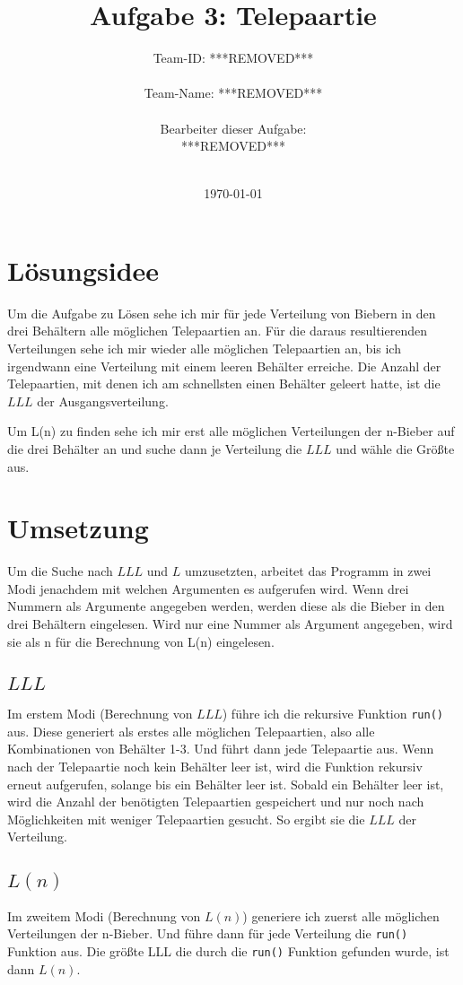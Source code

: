 \documentclass[a4paper,10pt]{scrartcl}
\title{Aufgabe 3: Telepaartie}
\author{Team-ID: ***REMOVED*** \\\\
	    Team-Name: ***REMOVED*** \\\\
	    Bearbeiter dieser Aufgabe: \\
	    ***REMOVED***\\\\}
\date{\today}
\begin{document}
\maketitle
\tableofcontents

\section{Lösungsidee}
Um die Aufgabe zu Lösen sehe ich mir für jede Verteilung von Biebern in den drei Behältern alle möglichen Telepaartien an. Für die daraus resultierenden Verteilungen sehe ich mir wieder alle möglichen Telepaartien an, bis ich irgendwann eine Verteilung mit einem leeren Behälter erreiche. Die Anzahl der Telepaartien, mit denen ich am schnellsten einen Behälter geleert hatte, ist die \(LLL\) der Ausgangsverteilung.

Um L(n) zu finden sehe ich mir erst alle möglichen Verteilungen der n-Bieber auf die drei Behälter an und suche dann je Verteilung die \(LLL\) und wähle die Größte aus.

\section{Umsetzung}
Um die Suche nach \(LLL\) und \(L\) umzusetzten, arbeitet das Programm in zwei Modi jenachdem mit welchen Argumenten es aufgerufen wird. Wenn drei Nummern als Argumente angegeben werden, werden diese als die Bieber in den drei Behältern eingelesen. Wird nur eine Nummer als Argument angegeben, wird sie als n für die Berechnung von L(n) eingelesen.

\subsection{\(LLL\)}
Im erstem Modi (Berechnung von \(LLL\)) führe ich die rekursive Funktion \lstinline|run()| aus. Diese generiert als erstes alle möglichen Telepaartien, also alle Kombinationen von Behälter 1-3. Und führt dann jede Telepaartie aus. Wenn nach der Telepaartie noch kein Behälter leer ist, wird die Funktion rekursiv erneut aufgerufen, solange bis ein Behälter leer ist. Sobald ein Behälter leer ist, wird die Anzahl der benötigten Telepaartien gespeichert und nur noch nach Möglichkeiten mit weniger Telepaartien gesucht. So ergibt sie die \(LLL\) der Verteilung.

\subsection{\(L(n)\)}
Im zweitem Modi (Berechnung von \(L(n)\)) generiere ich zuerst alle möglichen Verteilungen der n-Bieber. Und führe dann für jede Verteilung die \lstinline|run()| Funktion aus. Die größte LLL die durch die \lstinline|run()| Funktion gefunden wurde, ist dann \(L(n)\).
\end{document}
